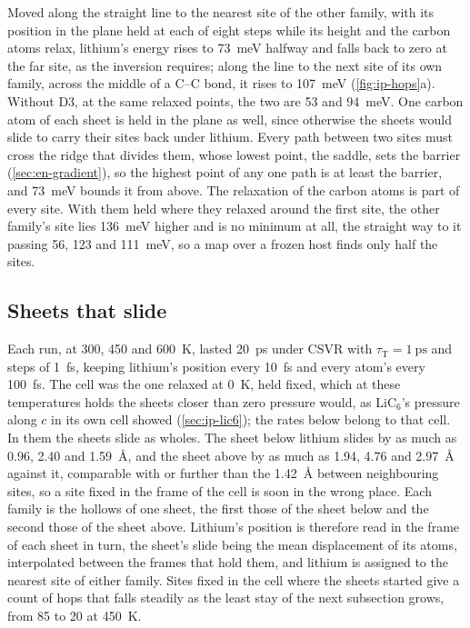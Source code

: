 Moved along the straight line to the nearest site of the other family,
with its position in the plane held at each of eight steps while its
height and the carbon atoms relax, lithium's energy rises to
\SI{73}{\milli\electronvolt} halfway and falls back to zero at the far
site, as the inversion requires; along the line to the next site of its
own family, across the middle of a C--C bond, it rises to
\SI{107}{\milli\electronvolt} (\cref{fig:ip-hops}a). Without D3, at the
same relaxed points, the two are 53 and \SI{94}{\milli\electronvolt}. One
carbon atom of each sheet is held in the plane as well, since otherwise
the sheets would slide to carry their sites back under lithium. Every
path between two sites must cross the ridge that divides them, whose
lowest point, the saddle, sets the barrier (\cref{sec:en-gradient}), so
the highest point of any one path is at least the barrier, and
\SI{73}{\milli\electronvolt} bounds it from above. The relaxation of the
carbon atoms is part of every site. With them held where they relaxed
around the first site, the other family's site lies
\SI{136}{\milli\electronvolt} higher and is no minimum at all, the
straight way to it passing 56, 123 and \SI{111}{\milli\electronvolt}, so
a map over a frozen host finds only half the sites.

\subsection*{Sheets that slide}

Each run, at 300, 450 and \SI{600}{\kelvin}, lasted \SI{20}{\pico\second}
under CSVR with $\tau_{\mathrm T} = \SI{1}{\pico\second}$ and steps of
\SI{1}{\femto\second}, keeping lithium's position every
\SI{10}{\femto\second} and every atom's every \SI{100}{\femto\second}.
The cell was the one relaxed at \SI{0}{\kelvin}, held fixed, which at
these temperatures holds the sheets closer than zero pressure would, as
LiC$_6$'s pressure along $c$ in its own cell showed (\cref{sec:ip-lic6});
the rates below belong to that cell. In them the sheets slide as wholes. The sheet
below lithium slides by as much as 0.96, 2.40 and \SI{1.59}{\angstrom},
and the sheet above by as much as 1.94, 4.76 and \SI{2.97}{\angstrom}
against it, comparable with or further than the \SI{1.42}{\angstrom}
between neighbouring sites, so a site fixed in the frame of the cell is
soon in the wrong place. Each family is the hollows of one sheet, the
first those of the sheet below and the second those of the sheet above.
Lithium's position is therefore read in the frame of each sheet in turn,
the sheet's slide being the mean displacement of its atoms, interpolated
between the frames that hold them, and lithium is assigned to the
nearest site of either family. Sites fixed in the cell where the sheets
started give a count of hops that falls steadily as the least stay of the
next subsection grows, from 85 to 20 at \SI{450}{\kelvin}.

